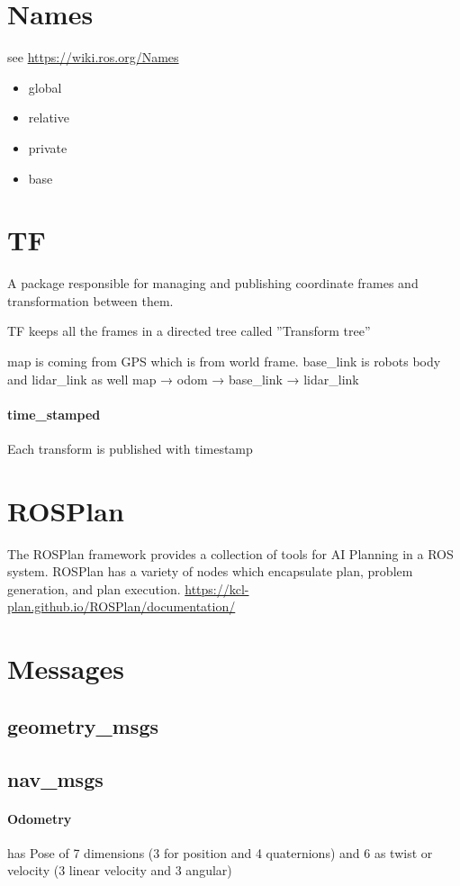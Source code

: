 \section{Names}
    see \url{https://wiki.ros.org/Names}
    \begin{itemize}
        \item global
        \item relative
        \item private
        \item base
    \end{itemize}

\section{TF}
    A package responsible for managing and publishing coordinate frames and transformation between them.
    
    TF keeps all the frames in a directed tree called ''Transform tree''
    
    
    map is coming from GPS which is from world frame. base\_link is robots body and lidar\_link as well
    map → odom → base\_link → lidar\_link
    
    \paragraph{time\_stamped}
        Each transform is published with timestamp
        
\section{ROSPlan}
    The ROSPlan framework provides a collection of tools for AI Planning in a ROS system. ROSPlan has a variety of nodes which encapsulate plan, problem generation, and plan execution.
    \url{https://kcl-plan.github.io/ROSPlan/documentation/}
\section{Messages}
    \subsection{geometry\_msgs}
    \subsection{nav\_msgs}
        \paragraph{Odometry}
            has Pose of 7 dimensions (3 for position and 4 quaternions) and 6 as twist or velocity (3 linear velocity and 3 angular)
